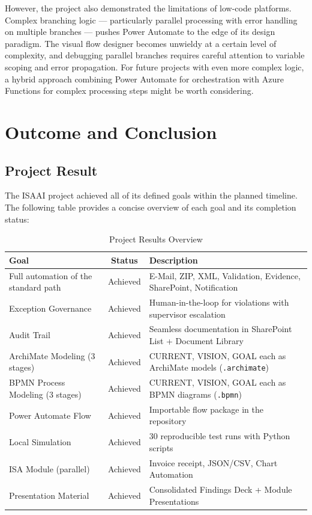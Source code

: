 \documentclass[11pt,a4paper]{article}
\begin{document}
However, the project also demonstrated the limitations of low-code platforms. Complex branching logic --- particularly parallel processing with error handling on multiple branches --- pushes Power Automate to the edge of its design paradigm. The visual flow designer becomes unwieldy at a certain level of complexity, and debugging parallel branches requires careful attention to variable scoping and error propagation. For future projects with even more complex logic, a hybrid approach combining Power Automate for orchestration with Azure Functions for complex processing steps might be worth considering.



\section{Outcome and Conclusion}

\subsection{Project Result}

The ISAAI project achieved all of its defined goals within the planned timeline. The following table provides a concise overview of each goal and its completion status:

\begin{table}[ht]
\centering
\caption{Project Results Overview}
\begin{tabular}{@{}p{}cp{}@{}}
\toprule
\textbf{Goal} & \textbf{Status} & \textbf{Description} \\
\midrule
Full automation of the standard path & Achieved & E-Mail, ZIP, XML, Validation, Evidence, SharePoint, Notification \\
Exception Governance & Achieved & Human-in-the-loop for violations with supervisor escalation \\
Audit Trail & Achieved & Seamless documentation in SharePoint List + Document Library \\
ArchiMate Modeling (3 stages) & Achieved & CURRENT, VISION, GOAL each as ArchiMate models (\texttt{.archimate}) \\
BPMN Process Modeling (3 stages) & Achieved & CURRENT, VISION, GOAL each as BPMN diagrams (\texttt{.bpmn}) \\
Power Automate Flow & Achieved & Importable flow package in the repository \\
Local Simulation & Achieved & 30 reproducible test runs with Python scripts \\
ISA Module (parallel) & Achieved & Invoice receipt, JSON/CSV, Chart Automation \\
Presentation Material & Achieved & Consolidated Findings Deck + Module Presentations \\
\bottomrule
\end{tabular}
\end{table}
\end{document}
